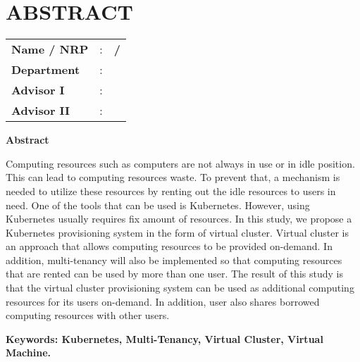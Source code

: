 \chapter*{ABSTRACT}


\vspace{2ex}

\begin{center}
  \large\textbf{\engtatitle{}}
\end{center}

\vspace{2ex}

\begingroup
\setlength{\tabcolsep}{0pt}

\noindent
\begin{tabularx}{\textwidth}{l >{\centering}m{3em} X}
  \textbf{Name / NRP} & : & \textbf{\name{} / \nrp{}} \\
  \textbf{Department} & : & \textbf{\engdepartment{}} \\
  \textbf{Advisor I}  & : & \textbf{\advisor{}}       \\
  \textbf{Advisor II} & : & \textbf{\coadvisor{}}     \\
\end{tabularx}
\endgroup

\noindent
\textbf{Abstract}

Computing resources such as computers are not always in use or in idle
position. This can lead to computing resources waste. To prevent that,
a mechanism is needed to utilize these resources  by renting out the
idle resources to users in need. One of the tools that can be used is Kubernetes.
However, using Kubernetes usually requires fix amount of resources. In this study,
we propose a Kubernetes provisioning system in the form of virtual cluster. Virtual
cluster is an approach that allows computing resources to be provided on-demand. In
addition, multi-tenancy will also be implemented so that computing resources that are
rented can be used by more than one user. The result of this study is that the virtual
cluster provisioning system can be used as additional computing resources for its users
on-demand. In addition, user also shares borrowed computing resources with other users.

\vspace{2ex}
\noindent
\textbf{Keywords: Kubernetes, Multi-Tenancy, Virtual Cluster, Virtual Machine.}
